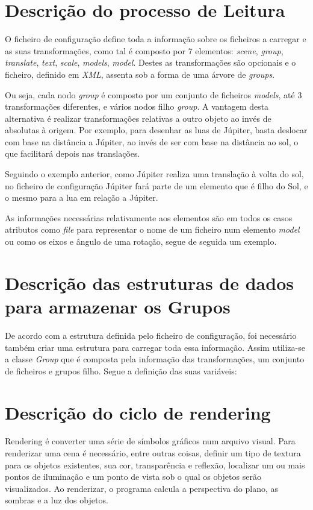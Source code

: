 \chapter{Descrição do processo de Leitura }

O ficheiro de configuração define toda a informação sobre os ficheiros a carregar e as suas transformações, como tal é composto por 7 elementos:
\textit{scene}, \textit{group}, \textit{translate}, \textit{text}, \textit{scale}, \textit{models}, \textit{model}. 
Destes as transformações são opcionais e o ficheiro, definido em \textit{XML}, assenta sob a forma de uma árvore de \textit{groups}.

Ou seja, cada nodo \textit{group} é composto por um conjunto de ficheiros \textit{models}, até 3 transformações diferentes, e vários nodos filho \textit{group}. 
A vantagem desta alternativa é realizar transformações relativas a outro objeto ao invés de absolutas à origem. 
Por exemplo, para desenhar as luas de Júpiter, basta deslocar com base na distância a Júpiter, ao invés de ser com base na distância ao sol, o que facilitará depois nas translações. 

Seguindo o exemplo anterior, como Júpiter realiza uma translação à volta do sol, no ficheiro de configuração Júpiter fará parte de um elemento que é filho do Sol, e o mesmo para a lua em relação a Júpiter.

As informações necessárias relativamente aos elementos são em todos os casos atributos como \textit{file} para representar o nome de um ficheiro num elemento \textit{model} ou como os eixos e ângulo de uma rotação, segue de seguida um exemplo.


\chapter{ Descrição das estruturas de dados para armazenar os Grupos}

De acordo com a estrutura definida pelo ficheiro de configuração, foi necessário também criar uma estrutura para carregar toda essa informação.  Assim utiliza-se a classe \textit{Group }que é composta pela informação das transformações, um conjunto de ficheiros e grupos filho. Segue a definição das
suas variáveis:

\chapter{ Descrição do ciclo de rendering}

Rendering é converter uma série de símbolos gráficos num arquivo visual. 
Para renderizar uma cena é necessário, entre outras coisas, definir um tipo de textura para os objetos existentes, sua cor, transparência e reflexão, localizar um ou mais pontos de iluminação e um ponto de vista sob o qual os objetos serão visualizados. Ao renderizar, o programa calcula a perspectiva do plano, as sombras e a luz dos objetos.








